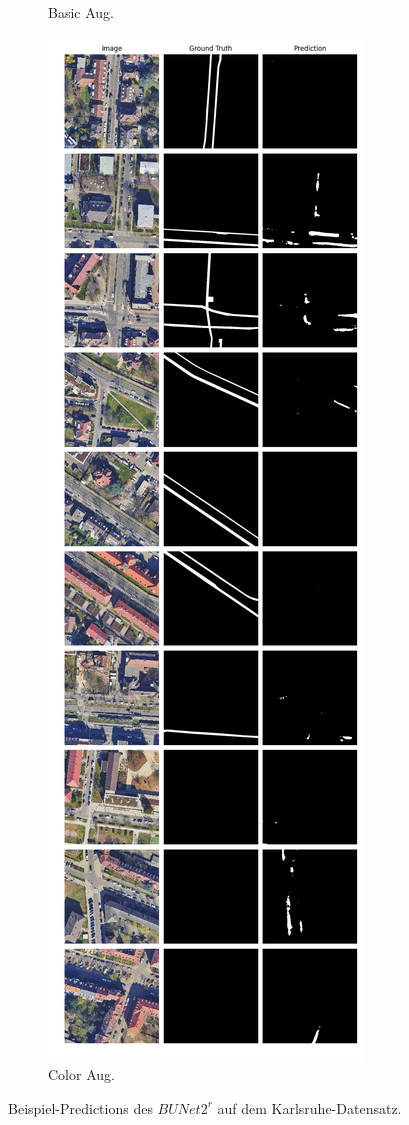 \begin{figure}
\begin{subfigure}{.4\textwidth}
		\caption{Basic Aug.}
	\end{subfigure}
	\begin{subfigure}{.4\textwidth}
		\centering
		\includegraphics[width=1.\textwidth]{Bilder/karlsruhe-color-samples/bunet2-r.png}
		\caption{Color Aug.}
	\end{subfigure}
	\caption{Beispiel-Predictions des $BUNet2^r$ auf dem Karlsruhe-Datensatz.}
	\label{fig:ka-samples-bunet2-r}
	\end{figure}
	
